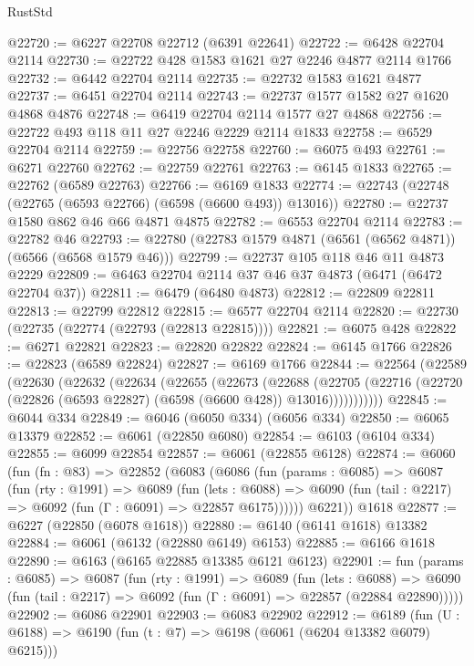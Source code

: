 \begin{lexlean}{RustStd}
\begin{coremodule}
@22720 := @6227 @22708 @22712 (@6391 @22641)
@22722 := @6428 @22704 @2114
@22730 := @22722 @428 @1583 @1621 @27 @2246 @4877 @2114 @1766
@22732 := @6442 @22704 @2114
@22735 := @22732 @1583 @1621 @4877
@22737 := @6451 @22704 @2114
@22743 := @22737 @1577 @1582 @27 @1620 @4868 @4876
@22748 := @6419 @22704 @2114 @1577 @27 @4868
@22756 := @22722 @493 @118 @11 @27 @2246 @2229 @2114 @1833
@22758 := @6529 @22704 @2114
@22759 := @22756 @22758
@22760 := @6075 @493
@22761 := @6271 @22760
@22762 := @22759 @22761
@22763 := @6145 @1833
@22765 := @22762 (@6589 @22763)
@22766 := @6169 @1833
@22774 := @22743 (@22748 (@22765 (@6593 @22766) (@6598 (@6600 @493)) @13016))
@22780 := @22737 @1580 @862 @46 @66 @4871 @4875
@22782 := @6553 @22704 @2114
@22783 := @22782 @46
@22793 := @22780 (@22783 @1579 @4871 (@6561 (@6562 @4871)) (@6566 (@6568 @1579 @46)))
@22799 := @22737 @105 @118 @46 @11 @4873 @2229
@22809 := @6463 @22704 @2114 @37 @46 @37 @4873 (@6471 (@6472 @22704 @37))
@22811 := @6479 (@6480 @4873)
@22812 := @22809 @22811
@22813 := @22799 @22812
@22815 := @6577 @22704 @2114
@22820 := @22730 (@22735 (@22774 (@22793 (@22813 @22815))))
@22821 := @6075 @428
@22822 := @6271 @22821
@22823 := @22820 @22822
@22824 := @6145 @1766
@22826 := @22823 (@6589 @22824)
@22827 := @6169 @1766
@22844 := @22564
    (@22589
      (@22630
        (@22632
          (@22634
            (@22655
              (@22673
                (@22688
                  (@22705
                    (@22716 (@22720 (@22826 (@6593 @22827) (@6598 (@6600 @428)) @13016)))))))))))
@22845 := @6044 @334
@22849 := @6046 (@6050 @334) (@6056 @334)
@22850 := @6065 @13379
@22852 := @6061 (@22850 @6080)
@22854 := @6103 (@6104 @334)
@22855 := @6099 @22854
@22857 := @6061 (@22855 @6128)
@22874 := @6060
    (fun (fn : @83) =>
    @22852
      (@6083
        (@6086
          (fun (params : @6085) =>
          @6087
            (fun (rty : @1991) =>
            @6089
              (fun (lets : @6088) =>
              @6090 (fun (tail : @2217) => @6092 (fun (Γ : @6091) => @22857 @6175))))))
        @6221))
    @1618
@22877 := @6227 (@22850 (@6078 @1618))
@22880 := @6140 (@6141 @1618) @13382
@22884 := @6061 (@6132 (@22880 @6149) @6153)
@22885 := @6166 @1618
@22890 := @6163 (@6165 @22885 @13385 @6121 @6123)
@22901 := fun (params : @6085) =>
  @6087
    (fun (rty : @1991) =>
    @6089
      (fun (lets : @6088) =>
      @6090 (fun (tail : @2217) => @6092 (fun (Γ : @6091) => @22857 (@22884 @22890)))))
@22902 := @6086 @22901
@22903 := @6083 @22902
@22912 := @6189
    (fun (U : @6188) => @6190 (fun (t : @7) => @6198 (@6061 (@6204 @13382 @6079) @6215)))

\end{coremodule}
\end{lexlean}
